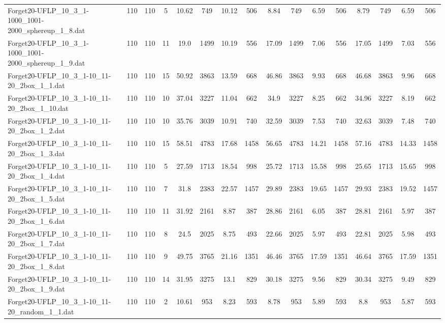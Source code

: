 \begin{sidewaystable}[!ht]
{\begin{tabular}{lccccccccccccccc}
Forget20-UFLP\_10\_3\_1-1000\_1001-2000\_sphereup\_1\_8.dat & 110 & 110 & 5 & 10.62 & 749 & 10.12 & 506 & 8.84 & 749 & 6.59 & 506 & 8.79 & 749 & 6.59 & 506 \\
Forget20-UFLP\_10\_3\_1-1000\_1001-2000\_sphereup\_1\_9.dat & 110 & 110 & 11 & 19.0 & 1499 & 10.19 & 556 & 17.09 & 1499 & 7.06 & 556 & 17.05 & 1499 & 7.03 & 556 \\
Forget20-UFLP\_10\_3\_1-10\_11-20\_2box\_1\_1.dat & 110 & 110 & 15 & 50.92 & 3863 & 13.59 & 668 & 46.86 & 3863 &  \textcolor{blue2}{9.93} & 668 & 46.68 & 3863 & 9.96 & 668 \\
Forget20-UFLP\_10\_3\_1-10\_11-20\_2box\_1\_10.dat & 110 & 110 & 10 & 37.04 & 3227 & 11.04 & 662 & 34.9 & 3227 & 8.25 & 662 & 34.96 & 3227 &  \textcolor{blue2}{8.19} & 662 \\
Forget20-UFLP\_10\_3\_1-10\_11-20\_2box\_1\_2.dat & 110 & 110 & 10 & 35.76 & 3039 & 10.91 & 740 & 32.59 & 3039 & 7.53 & 740 & 32.63 & 3039 & 7.48 & 740 \\
Forget20-UFLP\_10\_3\_1-10\_11-20\_2box\_1\_3.dat & 110 & 110 & 15 & 58.51 & 4783 & 17.68 & 1458 & 56.65 & 4783 &  \textcolor{blue2}{14.21} & 1458 & 57.16 & 4783 & 14.33 & 1458 \\
Forget20-UFLP\_10\_3\_1-10\_11-20\_2box\_1\_4.dat & 110 & 110 & 5 & 27.59 & 1713 & 18.54 & 998 & 25.72 & 1713 &  \textcolor{blue2}{15.58} & 998 & 25.65 & 1713 & 15.65 & 998 \\
Forget20-UFLP\_10\_3\_1-10\_11-20\_2box\_1\_5.dat & 110 & 110 & 7 & 31.8 & 2383 & 22.57 & 1457 & 29.89 & 2383 & 19.65 & 1457 & 29.93 & 2383 & 19.52 & 1457 \\
Forget20-UFLP\_10\_3\_1-10\_11-20\_2box\_1\_6.dat & 110 & 110 & 11 & 31.92 & 2161 & 8.87 & 387 & 28.86 & 2161 & 6.05 & 387 & 28.81 & 2161 &  \textcolor{blue2}{5.97} & 387 \\
Forget20-UFLP\_10\_3\_1-10\_11-20\_2box\_1\_7.dat & 110 & 110 & 8 & 24.5 & 2025 & 8.75 & 493 & 22.66 & 2025 & 5.97 & 493 & 22.81 & 2025 & 5.98 & 493 \\
Forget20-UFLP\_10\_3\_1-10\_11-20\_2box\_1\_8.dat & 110 & 110 & 9 & 49.75 & 3765 & 21.16 & 1351 & 46.46 & 3765 & 17.59 & 1351 & 46.64 & 3765 & 17.59 & 1351 \\
Forget20-UFLP\_10\_3\_1-10\_11-20\_2box\_1\_9.dat & 110 & 110 & 14 & 31.95 & 3275 & 13.1 & 829 & 30.18 & 3275 & 9.56 & 829 & 30.34 & 3275 &  \textcolor{blue2}{9.49} & 829 \\
Forget20-UFLP\_10\_3\_1-10\_11-20\_random\_1\_1.dat & 110 & 110 & 2 & 10.61 & 953 & 8.23 & 593 & 8.78 & 953 & 5.89 & 593 & 8.8 & 953 & 5.87 & 593 \\

\end{tabular}}
\end{sidewaystable}
